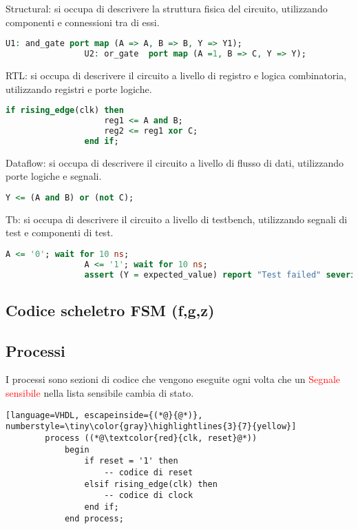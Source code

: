             Structural: si occupa di descrivere la struttura fisica del circuito, utilizzando componenti e connessioni tra di essi.
            \begin{lstlisting}[language=VHDL]
                U1: and_gate port map (A => A, B => B, Y => Y1);
                U2: or_gate  port map (A =1, B => C, Y => Y);
                \end{lstlisting}


            RTL: si occupa di descrivere il circuito a livello di registro e logica combinatoria, utilizzando registri e porte logiche.
            \begin{lstlisting}[language=VHDL]
                if rising_edge(clk) then
                    reg1 <= A and B;
                    reg2 <= reg1 xor C;
                end if;
                \end{lstlisting}


            Dataflow: si occupa di descrivere il circuito a livello di flusso di dati, utilizzando porte logiche e segnali.
            \begin{lstlisting}[language=VHDL]
                Y <= (A and B) or (not C);
                \end{lstlisting}


            Tb: si occupa di descrivere il circuito a livello di testbench, utilizzando segnali di test e componenti di test.
            \begin{lstlisting}[language=VHDL]
                A <= '0'; wait for 10 ns;
                A <= '1'; wait for 10 ns;
                assert (Y = expected_value) report "Test failed" severity error;
                \end{lstlisting}

    \subsection{Codice scheletro FSM (f,g,z)}

    \subsection{Processi}
        I processi sono sezioni di codice che vengono eseguite ogni volta che un \textcolor{red}{Segnale sensibile} nella lista sensibile cambia di stato.
        \begin{lstlisting}[language=VHDL, escapeinside={(*@}{@*)}, numberstyle=\tiny\color{gray}\highlightlines{3}{7}{yellow}]
        process ((*@\textcolor{red}{clk, reset}@*))
            begin
                if reset = '1' then
                    -- codice di reset
                elsif rising_edge(clk) then
                    -- codice di clock
                end if;
            end process;
        \end{lstlisting}